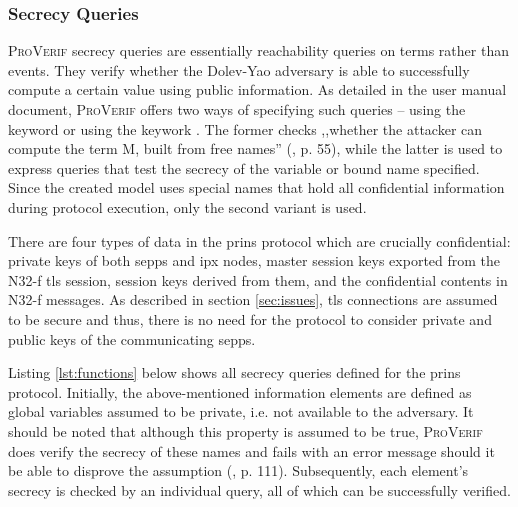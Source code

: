 \subsubsection{Secrecy Queries}
\label{ssec:secrecy}

\textsc{ProVerif} secrecy queries are essentially reachability queries on terms rather than events.
They verify whether the Dolev-Yao adversary is able to successfully compute a certain value using public information.
As detailed in the user manual document, \textsc{ProVerif} offers two ways of specifying such queries -- using the keyword {} or using the keywork {}.
The former checks ,,whether the attacker can compute the term M, built from free names'' (\cite{blanchet2020proverif}, p. 55), while the latter is used to express queries that test the secrecy of the variable or bound name specified.
Since the created model uses special names that hold all confidential information during protocol execution, only the second variant is used.

There are four types of data in the \gls{prins} protocol which are crucially confidential: private keys of both \glspl{sepp} and \gls{ipx} nodes, master session keys exported from the N32-f \gls{tls} session, session keys derived from them, and the confidential contents in N32-f messages.
As described in section \ref{sec:issues}, \gls{tls} connections are assumed to be secure and thus, there is no need for the protocol to consider private and public keys of the communicating \glspl{sepp}.

Listing \ref{lst:functions} below shows all secrecy queries defined for the \gls{prins} protocol.
Initially, the above-mentioned information elements are defined as global variables assumed to be private, i.e. not available to the adversary.
It should be noted that although this property is assumed to be true, \textsc{ProVerif} does verify the secrecy of these names and fails with an error message should it be able to disprove the assumption (\cite{blanchet2020proverif}, p. 111).
Subsequently, each element's secrecy is checked by an individual query, all of which can be successfully verified.

